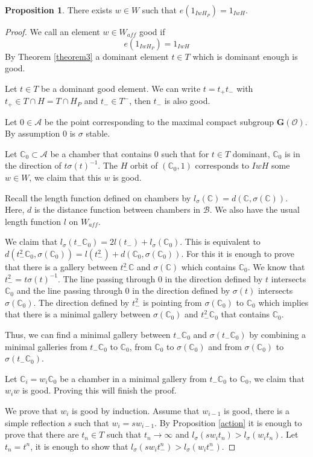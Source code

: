 \documentclass[12pt]{article}
\newcommand{\A}{\mathcal{A}}
\newcommand{\B}{\mathcal{B}}
\newcommand{\C}{\mathbb{C}}
\newcommand{\s}{\mathcal{O}}
\newcommand{\<}{\langle}
\renewcommand{\>}{\rangle}
\theoremstyle{plain}
\theoremstyle{definition}
\newtheorem{prop}[theorem]{Proposition}
\begin{document}
\begin{prop}\label{prop:matching}
There exists $w\in W$ such that $e(1_{IwH_P})=1_{IwH}$.
\end{prop}
\begin{proof}
 We call an element $w\in W_{aff}$ good if 
$$e(1_{IwH_P})=1_{IwH}$$
By Theorem \ref{theorem3} a dominant element $t\in T$ which is dominant enough is good.

Let $t\in T$ be a dominant good element. We can write $t=t_+t_-$ with $t_+\in T\cap H=T\cap H_P$ and $t_-\in T^-$, then $t_-$ is also good. 

Let $0\in \A$ be the point corresponding to the maximal compact subgroup $\mathbf{G}(\s)$. By assumption $0$ is $\sigma$ stable. 

Let $\C_0\subset \A$ be a chamber that contains $0$ such that for $t\in T$ dominant, $\C_0$ is in the direction of $t\sigma(t)^{-1}$. The $H$ orbit of $(\C_0,1)$ corresponds to $IwH$ some $w\in W$, we claim that this $w$ is good.

Recall the length function defined on chambers by $l_\sigma(\C)=d(\C,\sigma(\C))$. Here, $d$ is the distance function between chambers in $\B$. We also have the usual length function $l$ on $W_{aff}$.

We claim that $l_\sigma(t_-\C_0)=2l(t_-)+l_\sigma(\C_0)$. This is equivalent to $d(t^2_-\C_0,\sigma(\C_0))=l(t^2_-)+d(\C_0,\sigma(\C_0))$. For this it is enough to prove that there is a gallery between $t^2_-\C$ and $\sigma(\C)$ which contains $\C_0$. We know that $t^2_-=t\sigma(t)^{-1}$. The line passing through $0$ in the direction defined by $t$ intersects $\C_0$ and the line passing through $0$ in the direction defined by $\sigma(t)$ intersects $\sigma(\C_0)$. The direction defined by $t^2_-$ is pointing from $\sigma(\C_0)$ to $\C_0$ which implies that there is a minimal gallery between $\sigma(\C_0)$ and $t^2_-\C_0$ that contains $\C_0$.   


Thus, we can find a minimal gallery between $t_-\C_0$ and $\sigma(t_-\C_0)$ by combining a minimal galleries from $t_-\C_0$ to $\C_0$, from $\C_0$ to $\sigma(\C_0)$ and from $\sigma(\C_0)$ to $\sigma(t_-\C_0)$.


Let $\C_i=w_i\C_0$ be a chamber in a minimal gallery from $t_-\C_0$ to $\C_0$, we claim that $w_iw$ is good. Proving this will finish the proof. 


We prove that $w_i$ is good by induction. 
Assume that $w_{i-1}$ is good, there is a simple  reflection $s$ such that $w_i=sw_{i-1}$. By Proposition \ref{action} it is enough to prove that there are $t_n\in T$ such that $t_n\rightarrow \infty$ and $l_\sigma(sw_it_n)>l_\sigma(w_it_n)$. Let $t_n=t^n$, it is enough to show that $l_\sigma(sw_it^n_-)>l_\sigma(w_it^n_-)$. 



\end{proof}
\end{document}
